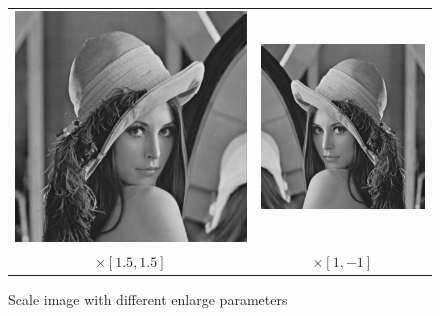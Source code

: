 \documentclass[11pt,a4paper]{article}
\begin{document}
\begin{figure}[!htbp]
\begin{tabular}{cc}
	\includegraphics[scale=0.3]{pro6/scale/scale_1_5_1_5}&
	\includegraphics[scale=0.3]{pro6/scale/scale_1_-1}\\
	$\times [1.5,1.5]$& $\times [1,-1]$
	\end{tabular}
	\caption{Scale image with different enlarge parameters}
	\label{pro6_fig6}
\end{figure}
\end{document}
